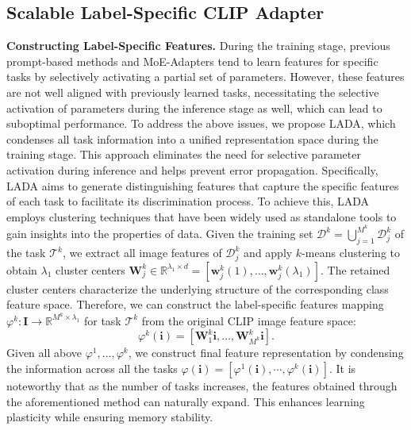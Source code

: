\documentclass{article}
\theoremstyle{plain}
\theoremstyle{definition}
\theoremstyle{remark}
\begin{document}
\subsection{Scalable Label-Specific CLIP Adapter}
\textbf{Constructing Label-Specific Features.} 
During the training stage, previous prompt-based methods and MoE-Adapters tend to learn features for specific tasks by selectively activating a partial set of parameters. However, these features are not well aligned with previously learned tasks, necessitating the selective activation of parameters during the inference stage as well, which can lead to suboptimal performance.
To address the above issues, we propose LADA, which condenses all task information into a unified representation space during the training stage. This approach eliminates the need for selective parameter activation during inference and helps prevent error propagation.
Specifically, LADA aims to generate distinguishing features that capture the specific features of each task to facilitate its discrimination process. 
To achieve this, LADA employs clustering techniques that have been widely used as standalone tools to gain insights into the properties of data. 
Given the training set $\mathcal{D}^{k} = \bigcup_{j=1}^{M^{k}} \mathcal{D}^{k}_{j} $ of the task $\mathcal{T}^{k}$, we extract all image features of $\mathcal{D}^{k}_{j}$ and apply $k$-means clustering to obtain $\lambda_1$ cluster centers $ \boldsymbol{W}_{j}^{k} \in \mathbb{R}^{\lambda_{1} \times d} = \left[\boldsymbol{w}_{j}^{k}(1), \dots , \boldsymbol{w}_{j}^{k} (\lambda_1)\right]$. 
The retained cluster centers characterize the underlying structure of the corresponding class feature space. 
Therefore, we can construct the label-specific features mapping $\varphi^{k}: \boldsymbol{I} \to \mathbb{R}^{M^{k} \times \lambda_{1}}$ for task $\mathcal{T}^{k}$ from the original CLIP image feature space:
\begin{equation}
\varphi^{k}(\boldsymbol{i}) = \left[\boldsymbol{W}_{1}^{k} \boldsymbol{i},  \dots , \boldsymbol{W}_{M^{k}}^{k} \boldsymbol{i} \right].
\end{equation}
Given all above $\varphi^{1}, \dots, \varphi^{k}$, we construct final feature representation by condensing the information across all the tasks $\varphi(\boldsymbol{i}) = [\varphi^1(\boldsymbol{i}), \cdots , \varphi^k (\boldsymbol{i})]$. It is noteworthy that as the number of tasks increases, the features obtained through the aforementioned method can naturally expand. This enhances learning plasticity while ensuring memory stability.
\end{document}
